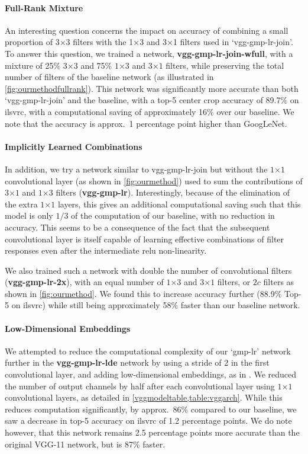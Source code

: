 \documentclass[thesis]{subfiles}
\begin{document}
    \paragraph{Full-Rank Mixture} An interesting question concerns the impact on accuracy of combining a small proportion of 3$\times$3 filters with the 1$\times$3 and 3$\times$1 filters used in ‘vgg-gmp-lr-join’. To answer this question, we trained a network, \textbf{vgg-gmp-lr-join-wfull}, with a mixture of 25\% $3$$\times$$3$ and 75\% $1$$\times$$3$ and $3$$\times$$1$ filters, while preserving the total number of filters of the baseline network (as illustrated in \cref{fig:ourmethodfullrank}). This network was significantly more accurate than both `vgg-gmp-lr-join' and the baseline, with a top-5 center crop accuracy of 89.7\% on \gls{ilsvrc}, with a computational saving of approximately 16\% over our baseline. We note that the accuracy is approx.~1 percentage point higher than GoogLeNet.
    
    \paragraph{Implicitly Learned Combinations} In addition, we try a network similar to vgg-gmp-lr-join but without the $1$$\times$$1$ convolutional layer (as shown in \cref{fig:ourmethod}) used to sum the contributions of $3$$\times$$1$ and $1$$\times$$3$ filters (\textbf{vgg-gmp-lr}). Interestingly, because of the elimination of the extra $1$$\times$$1$ layers, this gives an additional computational saving such that this model is only $1/3$ of the computation of our baseline, with no reduction in accuracy. This seems to be a consequence of the fact that the subsequent convolutional layer is itself capable of learning effective combinations of filter responses even after the intermediate \gls{relu} non-linearity.
    
    We also trained such a network with double the number of convolutional filters (\textbf{vgg-gmp-lr-2x}), \ie with an equal number of $1$$\times$$3$ and $3$$\times$$1$ filters, or $2c$ filters as shown in \cref{fig:ourmethod}. We found this to increase accuracy further (88.9\% Top-5 on \gls{ilsvrc}) while still being approximately 58\% faster than our baseline network.
    
    \paragraph{Low-Dimensional Embeddings}
    We attempted to reduce the computational complexity of our `gmp-lr' network further in the \textbf{vgg-gmp-lr-lde} network by using a stride of 2 in the first convolutional layer, and adding low-dimensional embeddings, as in \citet{Lin2013NiN,Szegedy2014going}. We reduced the number of output channels by half after each convolutional layer using $1$$\times$$1$ convolutional layers, as detailed in \cref{vggmodeltable,table:vggarch}. While this reduces computation significantly, by approx.~86\% compared to our baseline, we saw a decrease in top-5 accuracy on \gls{ilsvrc} of 1.2 percentage points. We do note however, that this network remains 2.5 percentage points more accurate than the original VGG-11 network, but is 87\% faster.
    
\end{document}
